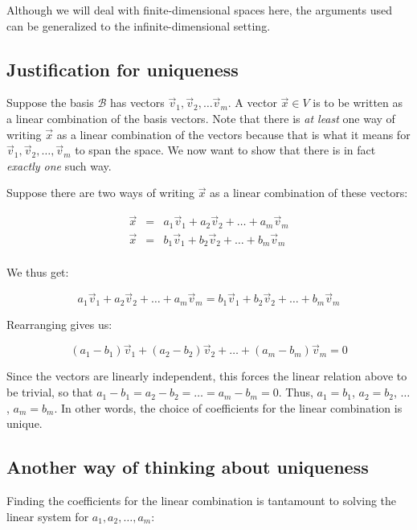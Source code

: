 \documentclass[10pt]{amsart}
\begin{document}
Although we will deal with finite-dimensional spaces here, the
arguments used can be generalized to the infinite-dimensional setting.

\subsection{Justification for uniqueness}

Suppose the basis $\mathcal{B}$ has vectors $\vec{v}_1,
\vec{v}_2,\dots\vec{v}_m$. A vector $\vec{x} \in V$ is to be written
as a linear combination of the basis vectors. Note that there is {\em
  at least} one way of writing $\vec{x}$ as a linear combination of
the vectors because that is what it means for
$\vec{v}_1,\vec{v}_2,\dots,\vec{v}_m$ to span the space. We now want
to show that there is in fact {\em exactly one} such way.

Suppose there are two ways of writing $\vec{x}$ as a linear
combination of these vectors:

\begin{eqnarray*}
  \vec{x} & = & a_1\vec{v}_1 + a_2\vec{v}_2 + \dots + a_m\vec{v}_m\\
  \vec{x} & = & b_1\vec{v}_1 + b_2\vec{v}_2 + \dots + b_m\vec{v}_m\\
\end{eqnarray*}

We thus get:

$$a_1\vec{v}_1 + a_2\vec{v}_2 + \dots + a_m\vec{v}_m = b_1\vec{v}_1 + b_2\vec{v}_2 + \dots + b_m\vec{v}_m$$

Rearranging gives us:

$$(a_1 - b_1)\vec{v}_1 + (a_2 - b_2)\vec{v}_2 + \dots + (a_m - b_m)\vec{v}_m = 0$$

Since the vectors are linearly independent, this forces the linear
relation above to be trivial, so that $a_1 - b_1 = a_2 - b_2 = \dots =
a_m - b_m = 0$. Thus, $a_1 = b_1$, $a_2 = b_2$, $\dots$, $a_m =
b_m$. In other words, the choice of coefficients for the linear
combination is unique.

\subsection{Another way of thinking about uniqueness}

Finding the coefficients for the linear combination is tantamount to
solving the linear system for $a_1,a_2,\dots,a_m$:
\end{document}
